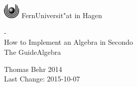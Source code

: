 \documentclass[a4paper,12pt]{article}
\begin{document}
\thispagestyle{empty}


\begin{center}
\begin{huge}
\vspace*{3cm}
   \begin{minipage}{\textwidth}
     \vspace*{\fill}
    \begin{center}
       \includegraphics[width=0.8cm]{logo.eps} FernUniversit"at in Hagen
    \end{center}
     \vfill
   \end{minipage}
   -\\
   How to Implement an Algebra in {\sc Secondo} \\
   {\small The GuideAlgebra} \\[4cm]
\end{huge}
\begin{large}
   Thomas Behr 2014\\[3cm]
   Last Change: 2015-10-07
\end{large}

\end{center}
\clearpage
\thispagestyle{empty} 
\ 
\newpage
\end{document}
